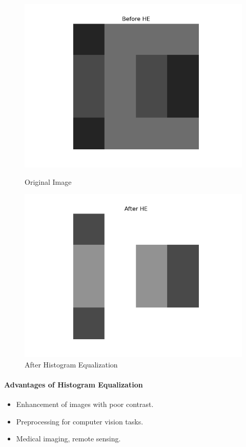 {\begin{figure}[H]
    \centering
    \begin{minipage}{0.45\linewidth}
        \centering
        \includegraphics[width=\linewidth]{lec02/Before_HE.png}
        \caption{Original Image}
    \end{minipage}
    \hfill
    \begin{minipage}{0.45\linewidth}
        \centering
        \includegraphics[width=\linewidth]{lec02/After_HE.png}
        \caption{After Histogram Equalization}
    \end{minipage}
    \label{hist_eq}
\end{figure}

}
\paragraph{Advantages of Histogram Equalization}
\begin{itemize}
    \item Enhancement of images with poor contrast.
    \item Preprocessing for computer vision tasks.
    \item Medical imaging, remote sensing.
\end{itemize}

